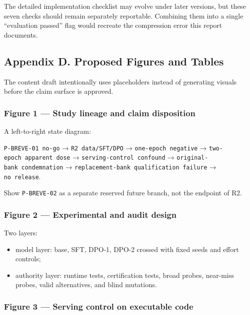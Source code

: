\documentclass[
  9pt,
  letterpaper,
]{article}
\providecommand{\tightlist}{%
  \setlength{\itemsep}{0pt}\setlength{\parskip}{0pt}}
\begin{document}
The detailed implementation checklist may evolve under later versions,
but these seven checks should remain separately reportable. Combining
them into a single ``evaluation passed'' flag would recreate the
compression error this report documents.

\hypertarget{appendix-d-proposed-figures-and-tables}{%
\subsection{Appendix D. Proposed Figures and
Tables}\label{appendix-d-proposed-figures-and-tables}}

The content draft intentionally uses placeholders instead of generating
visuals before the claim surface is approved.

\hypertarget{figure-1--study-lineage-and-claim-disposition}{%
\subsubsection{Figure 1 --- Study lineage and claim
disposition}\label{figure-1--study-lineage-and-claim-disposition}}

A left-to-right state diagram:

\texttt{P-BREVE-01\ no-go} → \texttt{R2\ data/SFT/DPO} →
\texttt{one-epoch\ negative} → \texttt{two-epoch\ apparent\ dose} →
\texttt{serving-control\ confound} →
\texttt{original-bank\ condemnation} →
\texttt{replacement-bank\ qualification\ failure} →
\texttt{no\ release}.

Show \texttt{P-BREVE-02} as a separate reserved future branch, not the
endpoint of R2.

\hypertarget{figure-2--experimental-and-audit-design}{%
\subsubsection{Figure 2 --- Experimental and audit
design}\label{figure-2--experimental-and-audit-design}}

Two layers:

\begin{itemize}
\tightlist
\item
  model layer: base, SFT, DPO-1, DPO-2 crossed with fixed seeds and
  effort controls;
\item
  authority layer: runtime tests, certification tests, broad probes,
  near-miss probes, valid alternatives, and blind mutations.
\end{itemize}

\hypertarget{figure-3--serving-control-on-executable-code}{%
\subsubsection{Figure 3 --- Serving control on executable
code}\label{figure-3--serving-control-on-executable-code}}
\end{document}
